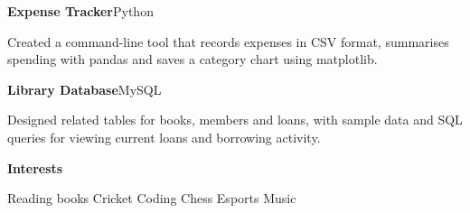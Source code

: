 \documentclass[11pt,a4paper]{article}
\newcommand{\cvsection}[1]{%
  \vspace{13pt}%
  {\large\bfseries\color{navy}#1}\par
  \vspace{3pt}{\color{blue}\rule{\linewidth}{0.8pt}}\vspace{5pt}
}
\begin{document}
\vspace{7pt}
\textbf{Expense Tracker}\hfill{\color{muted}Python}\par
Created a command-line tool that records expenses in CSV format,
summarises spending with pandas and saves a category chart using
matplotlib.

\vspace{7pt}
\textbf{Library Database}\hfill{\color{muted}MySQL}\par
Designed related tables for books, members and loans, with sample data
and SQL queries for viewing current loans and borrowing activity.

\cvsection{Interests}
Reading books \quad\textbullet\quad Cricket \quad\textbullet\quad Coding
\quad\textbullet\quad Chess \quad\textbullet\quad Esports
\quad\textbullet\quad Music
\end{document}
